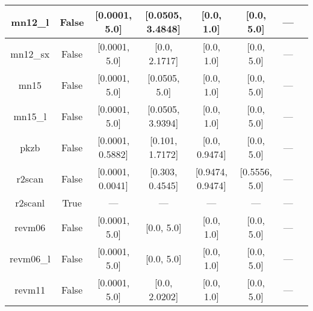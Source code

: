 \begin{tabular}{|c|c|c|c|c|c|c|l|}
      mn12\_l &                 False &    [0.0001, 5.0] & [0.0505, 3.4848] &       [0.0, 1.0] &     [0.0, 5.0] &        --- &                                                          \cite{Peverati2012_13171} \\ \hline
     mn12\_sx &                 False &    [0.0001, 5.0] &    [0.0, 2.1717] &       [0.0, 1.0] &     [0.0, 5.0] &        --- &                                                          \cite{Peverati2012_16187} \\ \hline
         mn15 &                 False &    [0.0001, 5.0] &    [0.0505, 5.0] &       [0.0, 1.0] &     [0.0, 5.0] &        --- &                                                                 \cite{Yu2016_5032} \\ \hline
      mn15\_l &                 False &    [0.0001, 5.0] & [0.0505, 3.9394] &       [0.0, 1.0] &     [0.0, 5.0] &        --- &                                                                 \cite{Yu2016_1280} \\ \hline
         pkzb &                 False & [0.0001, 0.5882] &  [0.101, 1.7172] &    [0.0, 0.9474] &     [0.0, 5.0] &        --- &                                                             \cite{Perdew1999_2544} \\ \hline
       r2scan &                 False & [0.0001, 0.0041] &  [0.303, 0.4545] & [0.9474, 0.9474] &  [0.5556, 5.0] &        --- &                                           \cite{Furness2020_8208,Furness2020_9248} \\ \hline
      r2scanl &                  True &              --- &              --- &              --- &            --- &        --- &                          \cite{Mejia2020_121109,Furness2020_8208,Furness2020_9248} \\ \hline
       revm06 &                 False &    [0.0001, 5.0] &       [0.0, 5.0] &       [0.0, 1.0] &     [0.0, 5.0] &        --- &                                                              \cite{Wang2018_10257} \\ \hline
    revm06\_l &                 False &    [0.0001, 5.0] &       [0.0, 5.0] &       [0.0, 1.0] &     [0.0, 5.0] &        --- &                                                               \cite{Wang2017_8487} \\ \hline
       revm11 &                 False &    [0.0001, 5.0] &    [0.0, 2.0202] &       [0.0, 1.0] &     [0.0, 5.0] &        --- &                                                              \cite{Verma2019_2966} \\ \hline

\end{tabular}

